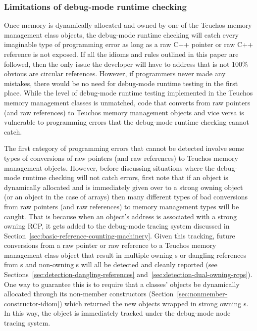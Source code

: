 \documentclass[pdf,ps2pdf,11pt]{SANDreport}
\begin{document}
%
{}\subsubsection{Limitations of debug-mode runtime checking}
\label{sec:limitations-debug-mode-checking}
%

Once memory is dynamically allocated and owned by one of the Teuchos
memory management class objects, the debug-mode runtime checking will
catch every imaginable type of programming error as long as a raw C++
pointer or raw C++ reference is not exposed.  If all the idioms and
rules outlined in this paper are followed, then the only issue the
developer will have to address that is not 100\% obvious are circular
references.  However, if programmers never made any mistakes, there
would be no need for debug-mode runtime testing in the first place.
While the level of debug-mode runtime testing implemented in the
Teuchos memory management classes is unmatched, code that converts
from raw pointers (and raw references) to Teuchos memory management
objects and vice versa is vulnerable to programming errors that the
debug-mode runtime checking cannot catch.

The first category of programming errors that cannot be detected
involve some types of conversions of raw pointers (and raw references)
to Teuchos memory management objects.  However, before discussing
situations where the debug-mode runtime checking will not catch
errors, first note that if an object is dynamically allocated and is
immediately given over to a strong owning {} object (or an
{} object in the case of arrays) then many different
types of bad conversions from raw pointers (and raw references) to
memory management types will be caught.  That is because when an
object's address is associated with a strong owning RCP, it gets added
to the debug-mode {} tracing system discussed in
Section~\ref{sec:basic-reference-counting-machinery}.  Given this
tracking, future conversions from a raw pointer or raw reference to a
Teuchos memory management class object that result in multiple owning
{}s or dangling references from {}s and non-owning
{}s will all be detected and cleanly reported (see
Sections~\ref{sec:detection-dangling-references}
and~\ref{sec:detection-dual-owning-rcps}).  One way to guarantee this
is to require that a classes' objects be dynamically allocated through
its non-member constructors
(Section~\ref{sec:nonmember-constructor-idiom}) which returned the new
objects wrapped in strong owning {}s.  In this way, the
object is immediately tracked under the debug-mode node tracing
system.
\end{document}
